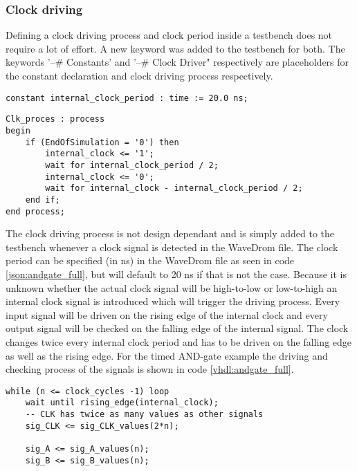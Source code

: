 \subsubsection{Clock driving}
Defining a clock driving process and clock period inside a testbench does not require a lot of effort. A new keyword was added to the testbench for both. The keywords '--\# Constants' and  '--\# Clock Driver" respectively are placeholders for the constant declaration and clock driving process respectively. 
\begin{lstlisting}[style=vhdl, caption={Definition of a std\_logic array}, label={vhdl:clock_period}]
constant internal_clock_period : time := 20.0 ns;
\end{lstlisting}\noindent
\begin{lstlisting}[style=vhdl, caption={Signal driving in clocked designs}, label={vhdl:driving_signals}]
Clk_proces : process
begin
	if (EndOfSimulation = '0') then
		internal_clock <= '1';
		wait for internal_clock_period / 2;
		internal_clock <= '0';
		wait for internal_clock - internal_clock_period / 2;
	end if;
end process;
\end{lstlisting}\noindent
The clock driving process is not design dependant and is simply added to the testbench whenever a clock signal is detected in the WaveDrom file. The clock period can be specified (in ns) in the WaveDrom file as seen in code \ref{json:andgate_full}, but will default to 20 ns if that is not the case.
\npar
Because it is unknown whether the actual clock signal will be high-to-low or low-to-high an internal clock signal is introduced which will trigger the driving process. Every input signal will be driven on the rising edge of the internal clock and every output signal will be checked on the falling edge of the internal signal. The clock changes twice every internal clock period and has to be driven on the falling edge as well as the rising edge. For the timed AND-gate example the driving and checking process of the signals is shown in code \ref{vhdl:andgate_full}.\newpage
\begin{lstlisting}[style=vhdl, caption={Signal driving in the AND-gate test derived from the source file in code \ref{json:andgate_full}}, label={vhdl:andgate_full}]
while (n <= clock_cycles -1) loop
	wait until rising_edge(internal_clock);
	-- CLK has twice as many values as other signals
	sig_CLK <= sig_CLK_values(2*n);		
	
	sig_A <= sig_A_values(n);
	sig_B <= sig_B_values(n);
\end{lstlisting}\noindent
